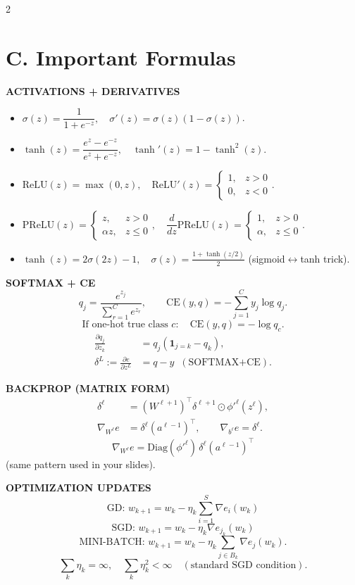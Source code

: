 \documentclass[10pt,fleqn]{article}
\begin{document}
\begin{multicols}{2}
\section*{C. Important Formulas}
\textbf{ACTIVATIONS + DERIVATIVES}
\begin{itemize}
  \item \(\sigma(z)=\dfrac{1}{1+e^{-z}},\quad \sigma'(z)=\sigma(z)\left(1-\sigma(z)\right)\).
  \item \(\tanh(z)=\dfrac{e^z-e^{-z}}{e^z+e^{-z}},\quad \tanh'(z)=1-\tanh^2(z)\).
  \item \(\mathrm{ReLU}(z)=\max(0,z),\quad \mathrm{ReLU}'(z)=\begin{cases}1,&z>0\\0,&z<0\end{cases}\).
  \item \(\mathrm{PReLU}(z)=\begin{cases}z,&z>0\\\alpha z,&z\le 0\end{cases},\quad
\dfrac{d}{dz}\mathrm{PReLU}(z)=\begin{cases}1,&z>0\\\alpha,&z\le0\end{cases}\).
  \item \(\tanh(z)=2\sigma(2z)-1,\quad \sigma(z)=\frac{1+\tanh(z/2)}{2}\) (sigmoid\(\leftrightarrow\)tanh trick).
\end{itemize}

\textbf{SOFTMAX + CE}
\[
q_j=\frac{e^{z_j}}{\sum_{r=1}^C e^{z_r}},\qquad
\mathrm{CE}(y,q)=-\sum_{j=1}^C y_j\log q_j.
\]
\[
\text{If one-hot true class }c:\quad \mathrm{CE}(y,q)=-\log q_c.
\]
\[
\begin{aligned}
\frac{\partial q_j}{\partial z_k}&=q_j(\mathbf{1}_{j=k}-q_k),\\
\delta^L:=\frac{\partial e}{\partial z^L}&=q-y \;\;(\text{SOFTMAX+CE}).
\end{aligned}
\]

\textbf{BACKPROP (MATRIX FORM)}
\[
\begin{aligned}
\delta^\ell&=\left(W^{\ell+1}\right)^\top\delta^{\ell+1}\odot \phi'^\ell(z^\ell),\\
\nabla_{W^\ell}e&=\delta^\ell (a^{\ell-1})^\top,\qquad
\nabla_{b^\ell}e=\delta^\ell.
\end{aligned}
\]
\[
\nabla_{W^\ell}e=\mathrm{Diag}(\phi'^\ell)\,\delta^\ell (a^{\ell-1})^\top
\]
(same pattern used in your slides).

\textbf{OPTIMIZATION UPDATES}
\[
\text{GD: } w_{k+1}=w_k-\eta_k\sum_{i=1}^S \nabla e_i(w_k)
\]
\[
\text{SGD: } w_{k+1}=w_k-\eta_k\nabla e_{j_k}(w_k)
\]
\[
\text{MINI-BATCH: } w_{k+1}=w_k-\eta_k\sum_{j\in B_k}\nabla e_j(w_k).
\]
\[
\sum_k \eta_k=\infty,\quad \sum_k \eta_k^2<\infty \quad (\text{standard SGD condition}).
\]


\end{multicols}
\end{document}
